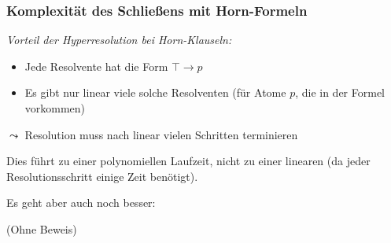 \documentclass[onlymath]{beamer}
\begin{document}
\begin{frame}\frametitle{Komplexität des Schließens mit Horn-Formeln}

\emph{Vorteil der Hyperresolution bei Horn-Klauseln:}
\begin{itemize}
\item Jede Resolvente hat die Form $\top\to p$
\item Es gibt nur linear viele solche Resolventen (für Atome $p$, die in der Formel vorkommen)
\end{itemize}
$\leadsto$ Resolution muss nach linear vielen Schritten terminieren
\pause\bigskip

Dies führt zu einer polynomiellen Laufzeit, nicht zu einer linearen (da jeder Resolutionsschritt einige Zeit benötigt).
\medskip

Es geht aber auch noch besser:


(Ohne Beweis)


\end{frame}
% 
% 
% 
% 



% 
% 
% 
% 

\end{document}
